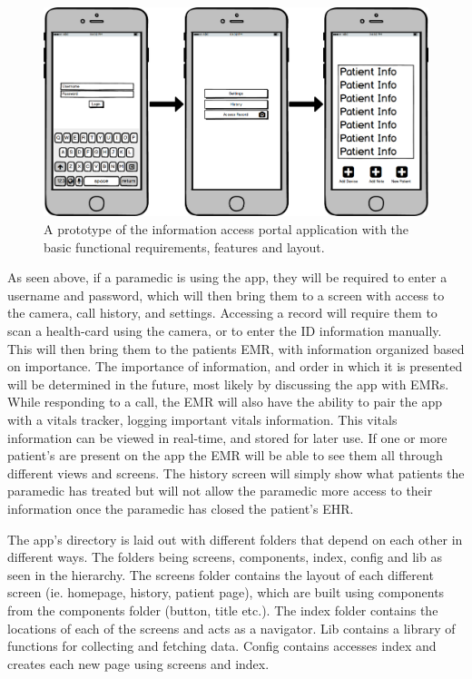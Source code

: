 \begin{figure}[h]
  \centering
  \includegraphics[width=\linewidth]{wireframe.png}
  \captionsetup{format=hang}
  \caption[Preliminary App Prototype]{A prototype of the information access portal application with the basic functional requirements, features and layout.}
  \label{fig:app1}
\end{figure}

As seen above, if a paramedic is using the app, they will be required to enter a username and password, which will then bring them to a screen with access to the camera, call history, and settings. Accessing a record will require them to scan a health-card using the camera, or to enter the ID information manually. This will then bring them to the patients EMR, with information organized based on importance. The importance of information, and order in which it is presented will be determined in the future, most likely by discussing the app with EMRs. While responding to a call, the EMR will also have the ability to pair the app with a vitals tracker, logging important vitals information. This vitals information can be viewed in real-time, and stored for later use. If one or more patient's are present on the app the EMR will be able to see them all through different views and screens. The history screen will simply show what patients the paramedic has treated but will not allow the paramedic more access to their information once the paramedic has closed the patient's EHR.

\iffalse


The app's directory is laid out with different folders that depend on each other in different ways. The folders being screens, components, index, config and lib as seen in the hierarchy. The screens folder contains the layout of each different screen (ie. homepage, history, patient page), which are built using components from the components folder (button, title etc.). The index folder contains the locations of each of the screens and acts as a navigator. Lib contains a library of functions for collecting and fetching data. Config contains accesses index and creates each new page using screens and index.




